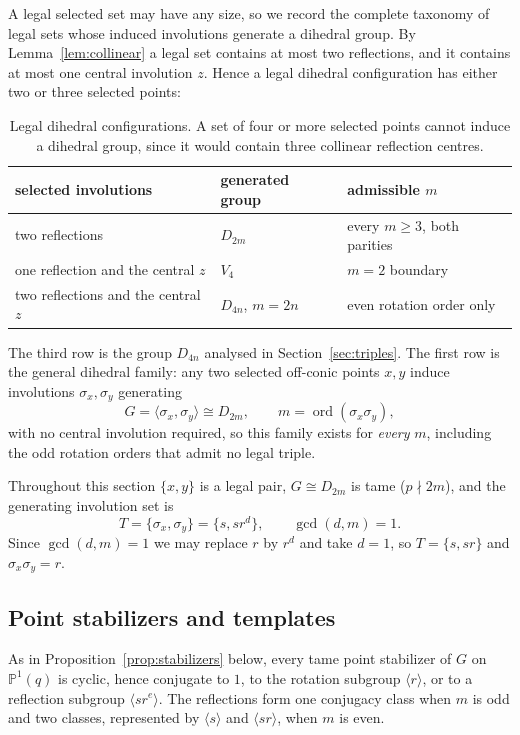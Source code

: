 \documentclass[11pt]{article}
\theoremstyle{definition}
\theoremstyle{remark}
\newcommand{\PP}{\mathbb{P}}
\DeclareMathOperator{\ord}{ord}
\begin{document}
A legal selected set may have any size, so we record the complete taxonomy of legal sets whose
induced involutions generate a dihedral group. By Lemma~\ref{lem:collinear} a legal set contains at
most two reflections, and it contains at most one central involution $z$. Hence a legal dihedral
configuration has either two or three selected points:

\begin{table}[H]
\centering
\begin{tabular}{lll}
\toprule
selected involutions & generated group & admissible $m$\\
\midrule
two reflections & $D_{2m}$ & every $m\ge3$, both parities\\
one reflection and the central $z$ & $V_4$ & $m=2$ boundary\\
two reflections and the central $z$ & $D_{4n}$, $m=2n$ & even rotation order only\\
\bottomrule
\end{tabular}
\caption{Legal dihedral configurations. A set of four or more selected points cannot induce a
dihedral group, since it would contain three collinear reflection centres.}
\label{tab:legal}
\end{table}

The third row is the group $D_{4n}$ analysed in Section~\ref{sec:triples}. The first row is the
general dihedral family: any two selected off-conic points $x,y$ induce involutions
$\sigma_x,\sigma_y$ generating
\[
  G=\langle\sigma_x,\sigma_y\rangle\cong D_{2m},\qquad m=\ord(\sigma_x\sigma_y),
\]
with no central involution required, so this family exists for \emph{every} $m$, including the odd
rotation orders that admit no legal triple.

Throughout this section $\{x,y\}$ is a legal pair, $G\cong D_{2m}$ is tame ($p\nmid 2m$), and the
generating involution set is
\[
  T=\{\sigma_x,\sigma_y\}=\{s,sr^d\},\qquad \gcd(d,m)=1 .
\]
Since $\gcd(d,m)=1$ we may replace $r$ by $r^d$ and take $d=1$, so $T=\{s,sr\}$ and
$\sigma_x\sigma_y=r$.

\subsection{Point stabilizers and templates}

As in Proposition~\ref{prop:stabilizers} below, every tame point stabilizer of $G$ on $\PP^1(q)$ is
cyclic, hence conjugate to $1$, to the rotation subgroup $\langle r\rangle$, or to a reflection
subgroup $\langle sr^e\rangle$. The reflections form one conjugacy class when $m$ is odd and two
classes, represented by $\langle s\rangle$ and $\langle sr\rangle$, when $m$ is even.
\end{document}
